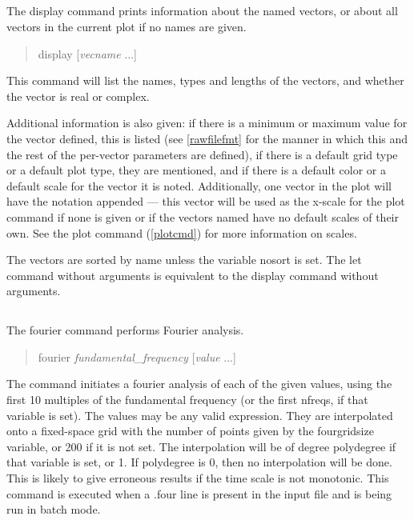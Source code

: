 \subsection{}


The {\cb display} command prints information about the named vectors,
or about all vectors in the current plot if no names are given.
\begin{quote}\vt
display [{\it vecname} ...]
\end{quote}
This command will list the names, types and lengths of the vectors,
and whether the vector is real or complex.

Additional information is also given:  if there is a minimum or
maximum value for the vector defined, this is listed (see
\ref{rawfilefmt} for the manner in which this and the rest of the
per-vector parameters are defined), if there is a default grid type or
a default plot type, they are mentioned, and if there is a default
color or a default scale for the vector it is noted.  Additionally,
one vector in the plot will have the notation {}
appended --- this vector will be used as the x-scale for the {\cb
plot} command if none is given or if the vectors named have no default
scales of their own.  See the {\cb plot} command (\ref{plotcmd}) for
more information on scales.

The vectors are sorted by name unless the variable {\et nosort} is
set.  The {\cb let} command without arguments is equivalent to the
{\cb display} command without arguments.

\subsection{}


The {\cb fourier} command performs Fourier analysis.
\begin{quote}\vt
fourier {\it fundamental\_frequency} [{\it value} ...]
\end{quote}
The command initiates a fourier analysis of each of the given values,
using the first 10 multiples of the fundamental frequency (or the
first {\vt nfreqs}, if that variable is set).  The values may be any
valid expression.  They are interpolated onto a fixed-space grid with
the number of points given by the {\et fourgridsize} variable, or 200
if it is not set.  The interpolation will be of degree {\et
polydegree} if that variable is set, or 1.  If {\et polydegree} is 0,
then no interpolation will be done.  This is likely to give erroneous
results if the time scale is not monotonic.  This command is executed
when a {\vt .four} line is present in the input file and {\WRspice} is
being run in batch mode.

